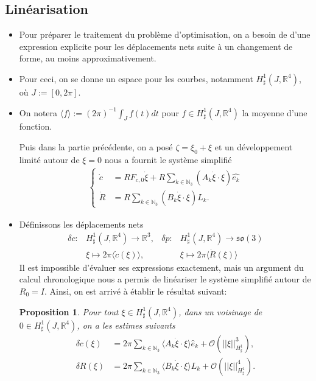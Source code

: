 \documentclass[12pt,a4paper]{article}
\theoremstyle{plain}
\theoremstyle{plain}
\theoremstyle{plain}
\theoremstyle{definition}
\theoremstyle{definition}
\theoremstyle{definition}
\theoremstyle{plain}
\newtheorem{proposition}{Proposition}[section]
\newcommand{\N}{\mathbb{N}}
\newcommand{\R}{\mathbb{R}}
\newcommand{\so}{\mathfrak{so}}
\begin{document}
\subsection{Linéarisation}
\begin{itemize}

\item Pour préparer le traitement du problème d'optimisation, on a besoin de d'une expression explicite pour les déplacements nets suite à un changement de forme, au moins approximativement.

\item Pour ceci, on se donne un espace pour les courbes, notamment $H^1_{\sharp}(J, \R^4)$, où $J := [0, 2\pi]$.

\item On notera $\langle f \rangle := (2 \pi)^{-1 }\int_{J} f(t) d t$ pour $f \in H^1_{\sharp}(J, \R^4)$ la moyenne d'une fonction.

Puis dans la partie précédente, on a posé $\zeta = \xi_0 + \xi$ et un développement limité autour de $\xi = 0$ nous a fournit le système simplifié
 \begin{align}
 \label{eq: dynamics first approx}
 \begin{cases}
 	\dot{c} &= R F_{c,0} \dot{\xi} + R \sum_{k \in \N_3}(A_k \dot{\xi} \cdot \xi)\hat{e_k}\\
 	\dot{R} &= R \sum_{k \in \N_3} (B_k \dot{\xi} \cdot \xi) L_k.
 \end{cases}
 \end{align}
 
\item Définissons les déplacements nets
\begin{align}
	\delta c: &H_{\sharp}^1(J,\R^4) \to \R^3, &
	\delta p: & H_{\sharp}^1(J,\R^4) \to \so(3)\\
	&\xi \mapsto 2\pi \langle \dot{c} (\xi) \rangle \nonumber, &
	&\xi \mapsto 2 \pi \langle \dot{R}(\xi) \rangle \nonumber
\end{align}
Il est impossible d'évaluer ses expressions exactement, mais un argument du calcul chronologique nous a permis de linéariser le système simplifié autour de $R_0 = I$. Ainsi, on est arrivé à établir le résultat suivant:
\begin{proposition}
\label{prop:net displacement}
Pour tout $\xi \in H_\sharp^1(J, \R^4)$, dans un voisinage de $0 \in H_{\sharp}^{1}(J, \R^4)$, on a les estimes suivants
\begin{equation}
\begin{aligned}
\delta c(\xi) &= 2 \pi \sum_{k \in \N_3} \langle A_k \dot{\xi} \cdot \xi \rangle \hat{e}_k + \mathcal{O}(||\xi||_{H^1_{\sharp}}^3),\\
\delta R(\xi) &= 2 \pi \sum_{k \in \N_3} \langle B_k \dot{\xi} \cdot \xi \rangle L_k + \mathcal{O}(||\xi||^4_{H_\sharp^1}).
\end{aligned}
\end{equation}
\end{proposition}


\end{itemize}
\end{document}
